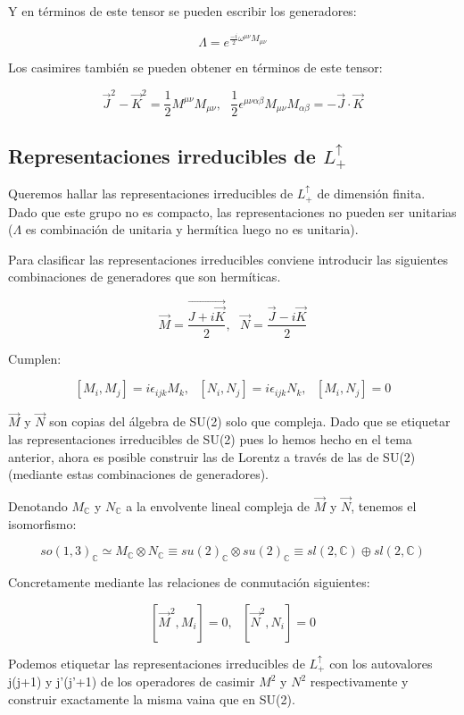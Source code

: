 \documentclass{article}
\begin{document}
        Y en términos de este tensor se pueden escribir los generadores:

        $$\Lambda = e^{\frac{-i}{2}\omega ^{\mu \nu} M_{\mu \nu}}$$

        Los casimires también se pueden obtener en términos de este tensor:

        $$\Vec{J}^2-\Vec{K}^2 = \frac{1}{2}M^{\mu \nu} M_{\mu \nu}, \ \ \ \frac{1}{2}\epsilon ^{\mu \nu \alpha \beta }M_{\mu \nu}M_{\alpha \beta}=-\Vec{J}\cdot \Vec{K}$$


        \subsection{Representaciones irreducibles de $L^\uparrow _+$}

        Queremos hallar las representaciones irreducibles de $L^\uparrow _+$ de dimensión finita. Dado que este grupo no es compacto, las representaciones no pueden ser unitarias ($\Lambda$ es combinación de unitaria y hermítica luego no es unitaria).

        \smallskip
        Para clasificar las representaciones irreducibles conviene introducir las siguientes combinaciones de generadores que son hermíticas.

        $$\Vec{M}=\frac{\Vec{J+i\Vec{K}}}{2}, \ \ \ \Vec{N}=\frac{\Vec{J}-i\Vec{K}}{2}$$

        Cumplen:

        $$[M_i,M_j]=i\epsilon _{ijk}M_k, \ \ \ [N_i,N_j]=i\epsilon _{ijk}N_k, \ \ \ [M_i,N_j]=0$$

        $\Vec{M}$ y $\Vec{N}$ son copias del álgebra de SU(2) solo que compleja. Dado que se etiquetar las representaciones irreducibles de SU(2) pues lo hemos hecho en el tema anterior, ahora es posible construir las de Lorentz a través de las de SU(2) (mediante estas combinaciones de generadores).

        \smallskip
        Denotando $M_\mathds{C}$ y $N_\mathds{C}$ a la envolvente lineal compleja de $\Vec{M}$ y $\Vec{N}$, tenemos el isomorfismo:

        $$so(1,3)_\mathds{C}\simeq M_\mathds{C}\otimes N_\mathds{C} \equiv su(2)_\mathds{C}\otimes su(2)_\mathds{C} \equiv sl(2,\mathds{C}) \oplus sl(2,\mathds{C})$$

        Concretamente mediante las relaciones de conmutación siguientes:

        $$[\Vec{M}^2,M_i]=0, \ \ \ [\Vec{N}^2,N_i]=0$$

        Podemos etiquetar las representaciones irreducibles de $L^\uparrow _+$ con los autovalores j(j+1) y j'(j'+1) de los operadores de casimir $M^2$ y $N^2$ respectivamente y construir exactamente la misma vaina que en SU(2).
\end{document}
